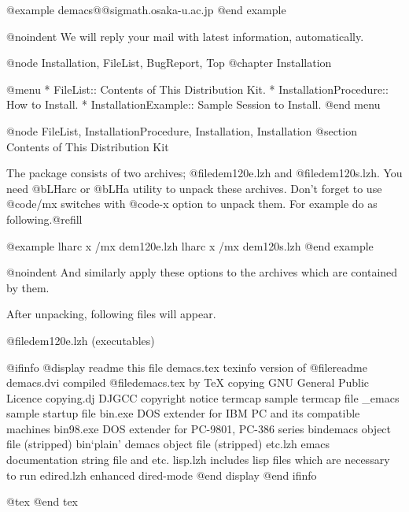 @example
demacs@@sigmath.osaka-u.ac.jp
@end example

@noindent
We will reply your mail with latest information, automatically.


@node Installation, FileList, BugReport, Top
@chapter Installation

@menu
* FileList::               Contents of This Distribution Kit.
* InstallationProcedure::  How to Install.
* InstallationExample::    Sample Session to Install.
@end menu


@node FileList, InstallationProcedure, Installation, Installation
@section Contents of This Distribution Kit

The package consists of two archives; @file{dem120e.lzh} and
@file{dem120s.lzh}. You need @b{LHarc} or @b{LHa} utility to unpack
these archives. Don't forget to use @code{/mx} switches with @code{-x}
option to unpack them. For example do as following.@refill

@example
lharc x /mx dem120e.lzh
lharc x /mx dem120s.lzh
@end example

@noindent
And similarly apply these options to the archives which are contained by
them.

After unpacking, following files will appear.

@file{dem120e.lzh} (executables)

@ifinfo
@display
readme            this file
demacs.tex        texinfo version of @file{readme}
demacs.dvi        compiled @file{demacs.tex} by TeX
copying           GNU General Public Licence
copying.dj        DJGCC copyright notice
termcap           sample termcap file
_emacs            sample startup file
bin\demacspc.exe  DOS extender for IBM PC and its compatible machines
bin\demacs98.exe  DOS extender for PC-9801, PC-386 series
bin\demacs        demacs object file (stripped)
bin\temacs        `plain' demacs object file (stripped)
etc.lzh           emacs documentation string file and etc.
lisp.lzh          includes lisp files which are necessary to run
edired.lzh        enhanced dired-mode
@end display
@end ifinfo

@tex
{}
@end tex


